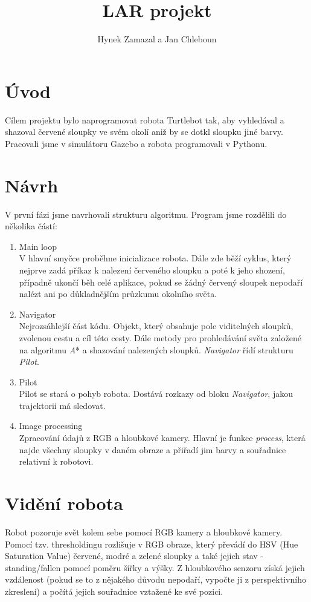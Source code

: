 \documentclass{article}
\title{LAR projekt}
\author{Hynek Zamazal a Jan Chleboun}
\date{}
\begin{document}
\maketitle
\section{Úvod}
Cílem projektu bylo naprogramovat robota Turtlebot tak, aby vyhledával a shazoval červené sloupky ve svém okolí aniž by se dotkl sloupku jiné barvy. Pracovali jsme v simulátoru Gazebo a robota programovali v Pythonu.
\section{Návrh}
V první fázi jsme navrhovali strukturu algoritmu. Program jsme rozdělili do několika částí:
\begin{enumerate}
    \item Main loop\\
V hlavní smyčce proběhne inicializace robota. Dále zde běží cyklus, který nejprve zadá příkaz k nalezení červeného sloupku a poté k jeho shození, případně ukončí běh celé aplikace, pokud se žádný červený sloupek nepodaří nalézt ani po důkladnějším průzkumu okolního světa.
    \item Navigator\\
    Nejrozsáhlejší část kódu. Objekt, který obsahuje pole viditelných sloupků, zvolenou cestu a cíl této cesty. Dále metody pro prohledávání světa založené na algoritmu \textit{A}* a shazování nalezených sloupků. \textit{Navigator} řídí strukturu \textit{Pilot}. 
    \item Pilot\\
    Pilot se stará o pohyb robota. Dostává rozkazy od bloku \textit{Navigator}, jakou trajektorii má sledovat.
    \item Image processing\\
    Zpracování údajů z RGB a hloubkové kamery. Hlavní je funkce \textit{process}, která najde všechny sloupky v daném obraze a přiřadí jim barvy a souřadnice relativní k robotovi.
\end{enumerate}
\section{Vidění robota}
Robot pozoruje svět kolem sebe pomocí RGB kamery a hloubkové kamery. Pomocí tzv. thresholdingu rozlišuje v RGB obraze, který převádí do HSV (Hue Saturation Value) červené, modré a zelené sloupky a také jejich stav - standing/fallen pomocí poměru šířky a výšky. Z hloubkového senzoru získá jejich vzdálenost (pokud se to z nějakého důvodu nepodaří, vypočte ji z perspektivního zkreslení) a počítá jejich souřadnice vztažené ke své pozici.
\end{document}
